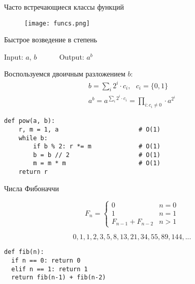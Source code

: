 
\begin{frame}{Часто встречающиеся классы функций}

  \begin{figure}
    \centering
    \texttt{[image: funcs.png]}
  \end{figure}

\end{frame}


\begin{frame}[fragile]{Быстрое возведение в степень}

Input: $a$, $b$ ~~~~~ Output: $a^b$

Воспользуемся двоичным разложением $b$:
$$
\begin{gathered}
b = \sum_{i} 2^i \cdot c_i ,~~~ c_i = \{0, 1\} \\
a^b = a^{\sum_{i} 2^i \cdot c_i} = \prod_{i: c_i \neq 0} \cdot a^{2^i}
\end{gathered}
$$

\begin{verbatim}
def pow(a, b):
    r, m = 1, a                      # O(1)
    while b:  
        if b % 2: r *= m             # O(1)
        b = b // 2                   # O(1)
        m = m * m                    # O(1)
    return r
\end{verbatim}


\end{frame}


\begin{frame}[fragile]{Числа Фибоначчи}

$$
F_n = \begin{cases}
0 & n = 0\\
1 & n = 1\\
F_{n-1} + F_{n-2} & n > 1
\end{cases}
$$

$$
0, 1, 1, 2, 3, 5, 8, 13, 21, 34, 55, 89, 144, ...
$$

\begin{verbatim}
def fib(n):
  if n == 0: return 0
  elif n == 1: return 1
  return fib(n-1) + fib(n-2)
\end{verbatim}

\end{frame}

